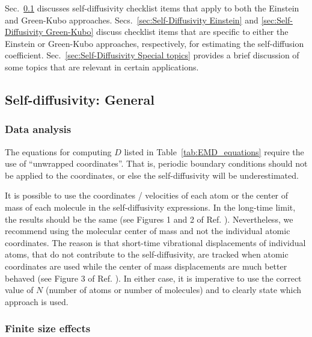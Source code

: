 \documentclass[9pt,bestpractices]{livecoms}
\begin{document}
Sec.\ \ref{sec:Self-Diffusivity General} discusses self-diffusivity checklist items that apply to both the Einstein and Green-Kubo approaches. Secs.\ \ref{sec:Self-Diffusivity Einstein} and \ref{sec:Self-Diffusivity Green-Kubo} discuss checklist items that are specific to either the Einstein or Green-Kubo approaches, respectively, for estimating the self-diffusion coefficient. Sec.\ \ref{sec:Self-Diffusivity Special topics} provides a brief discussion of some topics that are relevant in certain applications.

\subsection{Self-diffusivity: General} \label{sec:Self-Diffusivity General}


\subsubsection{Data analysis} \label{sec:Self-Diffusivity:General: Data analysis}

The equations for computing $D$ listed in Table~\ref{tab:EMD_equations} require the use of ``unwrapped coordinates''. That is, periodic boundary conditions should not be applied to the coordinates, or else the self-diffusivity will be underestimated. 

It is possible to use the coordinates / velocities of each atom or the center of mass of each molecule in the self-diffusivity expressions. In the long-time limit, the results should be the same (see Figures 1 and 2 of Ref. \cite{Mondello1997}). Nevertheless, we recommend using the molecular center of mass and not the individual atomic coordinates. The reason is that short-time vibrational displacements of individual atoms, that do not contribute to the self-diffusivity, are tracked when atomic coordinates are used while the center of mass displacements are much better behaved (see Figure 3 of Ref. \cite{Mondello1997}). In either case, it is imperative to use the correct value of $N$ (number of atoms or number of molecules) and to clearly state which approach is used.

\subsubsection{Finite size effects} \label{sec:Self-Diffusivity:General: Finite size}
\end{document}
